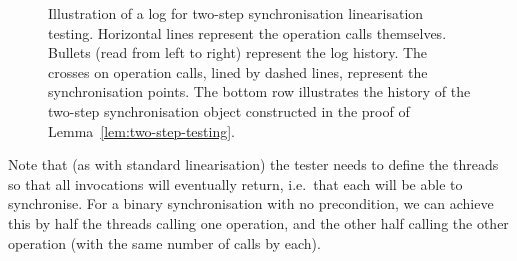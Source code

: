 \begin{figure}[tp]
\def\twoStep(#1,#2)#3{%
  \draw(#1-0.2,#2) \X; \draw(#1+0.2,#2) \X;
  \draw(#1,#2-0.4) node{\footnotesize #3};
}
\begin{center}
\end{center}
\caption{Illustration of a log for two-step synchronisation linearisation
  testing.  Horizontal lines represent the operation calls themselves.
  Bullets (read from left to right) represent the log history.  The crosses on
  operation calls, lined by dashed lines, represent the synchronisation
  points.  The bottom row illustrates the history of the two-step
  synchronisation object constructed in the proof of
  Lemma~\ref{lem:two-step-testing}.}
\label{fig:two-step-log}
\end{figure}


Note that (as with standard linearisation) the tester needs to define the
threads so that all invocations will eventually return, i.e.~that each will be
able to synchronise.  For a binary synchronisation with no precondition, we
can achieve this by half the threads calling one operation, and the other half
calling the other operation (with the same number of calls by each).

